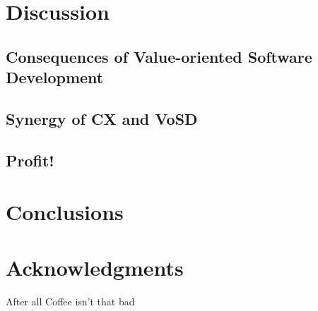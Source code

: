 \documentclass{sig-alternate}
\begin{document}
\section{Discussion}

\subsection{Consequences of Value-oriented Software Development}
\subsection{Synergy of CX and VoSD}
\subsection{Profit!}

\section{Conclusions}

\section{Acknowledgments}

After all Coffee isn't that bad 

%

%
%
\end{document}
